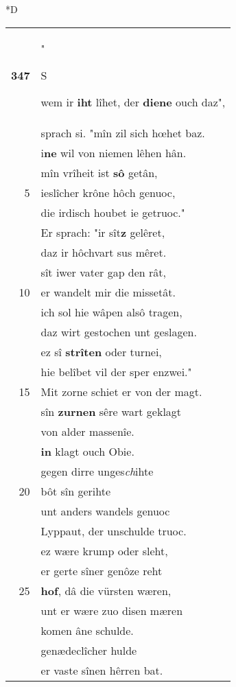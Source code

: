 \documentclass[8pt,a4paper,notitlepage]{article}
\begin{document}
\begin{table}[ht]
\begin{minipage}[t]{0.5\linewidth}
\small
\begin{center}*D
\end{center}
\begin{tabular}{rl}
\textbf{347} & "\begin{large}S\end{large}wem ir \textbf{iht} lîhet, der \textbf{diene} ouch daz",\\ 
 & sprach si. "mîn zil sich hœhet baz.\\ 
 & i\textbf{ne} wil von niemen lêhen hân.\\ 
 & mîn vrîheit ist \textbf{sô} getân,\\ 
5 & ieslîcher krône hôch genuoc,\\ 
 & die irdisch houbet ie getruoc."\\ 
 & Er sprach: "ir sît\textbf{z} gelêret,\\ 
 & daz ir hôchvart sus mêret.\\ 
 & sît iwer vater gap den rât,\\ 
10 & er wandelt mir die missetât.\\ 
 & ich sol hie wâpen alsô tragen,\\ 
 & daz wirt gestochen unt geslagen.\\ 
 & ez sî \textbf{strîten} oder turnei,\\ 
 & hie belîbet vil der sper enzwei."\\ 
15 & Mit zorne schiet er von der magt.\\ 
 & sîn \textbf{zurnen} sêre wart geklagt\\ 
 & von alder massenîe.\\ 
 & \textbf{in} klagt ouch Obie.\\ 
 & gegen dirre unges\textit{ch}ihte\\ 
20 & bôt sîn gerihte\\ 
 & unt anders wandels genuoc\\ 
 & Lyppaut, der unschulde truoc.\\ 
 & ez wære krump oder sleht,\\ 
 & er gerte sîner genôze reht\\ 
25 & \textbf{hof}, dâ die vürsten wæren,\\ 
 & unt er wære zuo disen mæren\\ 
 & komen âne schulde.\\ 
 & genædeclîcher hulde\\ 
 & er vaste sînen hêrren bat.\\ 

\end{tabular}
\end{minipage}
\end{table}
\end{document}
